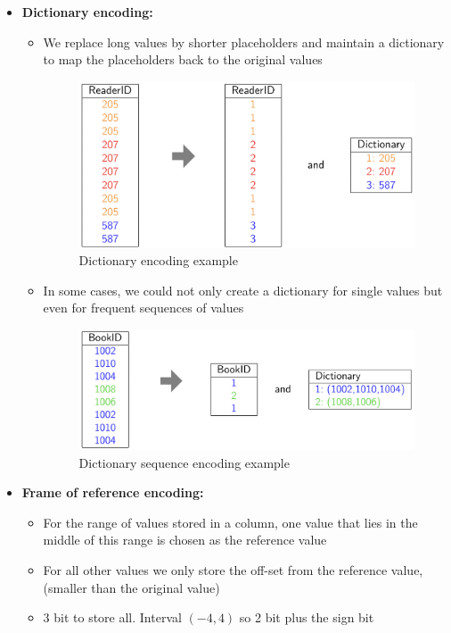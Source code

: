 \begin{itemize}
    \newpage
    \item \textbf{Dictionary encoding:} 
    \begin{itemize}
        \item We replace long values by shorter placeholders and maintain a dictionary to map the placeholders back to the original values
        \begin{figure}[!hbp]
            \centering
            \includegraphics[width=0.50\linewidth]{images/AdvancedDataManagment/column_stores/dictionary_encoding.jpeg}
            \caption{Dictionary encoding example}
        \end{figure}
        \item In some cases, we could not only create a dictionary for single values but even for frequent sequences of values
        \begin{figure}[!hbp]
            \centering
            \includegraphics[width=0.40\linewidth]{images/AdvancedDataManagment/column_stores/dictionary_encoding_sequence.jpeg}
            \caption{Dictionary sequence encoding example}
        \end{figure}
    \end{itemize}
    
    
    \item \textbf{Frame of reference encoding:}
    \begin{itemize}
        \item For the range of values stored in a column, one value that lies in the middle of this range is chosen as the reference value
        \item For all other values we only store the off-set from the reference value, (smaller than the original value)
        \item \(3\) bit to store all. Interval \((-4, 4)\) so 2 bit plus the sign bit
    \end{itemize}
    

\end{itemize}
